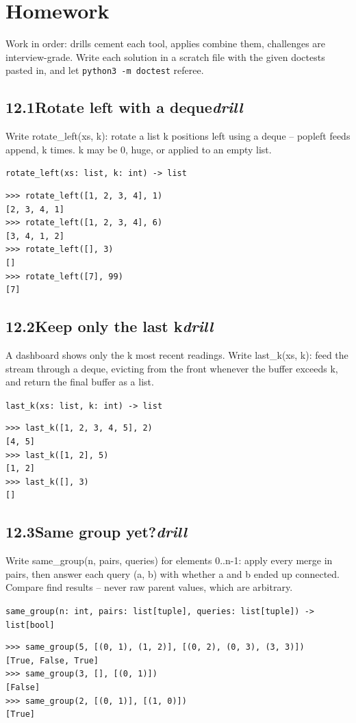 \documentclass[10pt,letterpaper]{book}
\begin{document}
\section{Homework}
Work in order: drills cement each tool, applies combine them,
challenges are interview-grade. Write each solution in a scratch file with
the given doctests pasted in, and let \texttt{python3 -m doctest} referee.
\subsection*{12.1\quad Rotate left with a deque\hfill\textnormal{\textit{drill}}}
Write rotate\_left(xs, k): rotate a list k positions left using a deque -- popleft feeds append, k times. k may be 0, huge, or applied to an empty list.

\noindent\texttt{rotate\_left(xs: list, k: int) -> list}
\begin{lstlisting}[style=ex]
>>> rotate_left([1, 2, 3, 4], 1)
[2, 3, 4, 1]
>>> rotate_left([1, 2, 3, 4], 6)
[3, 4, 1, 2]
>>> rotate_left([], 3)
[]
>>> rotate_left([7], 99)
[7]
\end{lstlisting}
\subsection*{12.2\quad Keep only the last k\hfill\textnormal{\textit{drill}}}
A dashboard shows only the k most recent readings. Write last\_k(xs, k): feed the stream through a deque, evicting from the front whenever the buffer exceeds k, and return the final buffer as a list.

\noindent\texttt{last\_k(xs: list, k: int) -> list}
\begin{lstlisting}[style=ex]
>>> last_k([1, 2, 3, 4, 5], 2)
[4, 5]
>>> last_k([1, 2], 5)
[1, 2]
>>> last_k([], 3)
[]
\end{lstlisting}
\subsection*{12.3\quad Same group yet?\hfill\textnormal{\textit{drill}}}
Write same\_group(n, pairs, queries) for elements 0..n-1: apply every merge in pairs, then answer each query (a, b) with whether a and b ended up connected. Compare find results -- never raw parent values, which are arbitrary.

\noindent\texttt{same\_group(n: int, pairs: list[tuple], queries: list[tuple]) -> list[bool]}
\begin{lstlisting}[style=ex]
>>> same_group(5, [(0, 1), (1, 2)], [(0, 2), (0, 3), (3, 3)])
[True, False, True]
>>> same_group(3, [], [(0, 1)])
[False]
>>> same_group(2, [(0, 1)], [(1, 0)])
[True]
\end{lstlisting}
\end{document}
